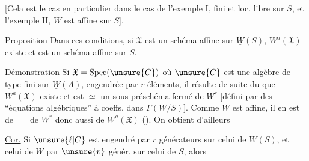 [Cela est le cas en particulier dans le cas de l'exemple I,   fini et loc. libre sur $S$, et l'exemple II,  $W$  est affine sur $S$].

\uline{Proposition} Dans ces conditions, si  $\mathfrak X$ est un schéma \uline{affine} sur $\underline W(S)$, $W^a(\mathfrak X)$ existe et est un schéma \uline{affine} sur $S$.

\uline{Démonstration}   Si $\mathfrak X=\operatorname{Spec}(\unsure{C})$ où $\unsure{C}$ est une algèbre de type fini  sur $\underline W(A)$, engendrée par $r$ éléments, il résulte de suite du  que $W^a(\mathfrak X)$ existe et est $\simeq$ un sous-préschéma fermé de $W^r$ [défini par des ``équations algébriques'' à coeffs.  dans $\Gamma(W/S)$]. Comme $W$ est affine, il en est de $=$ de  $W^r$ donc aussi de $W^a(\mathfrak X)$ (). On obtient d'ailleurs

\uline{Cor.}   Si $\unsure{\ell|C}$ est engendré par $r$ générateurs sur celui de $W(S)$, et celui de $W$ par $\unsure{v}$ génér. sur celui de $S$, alors
